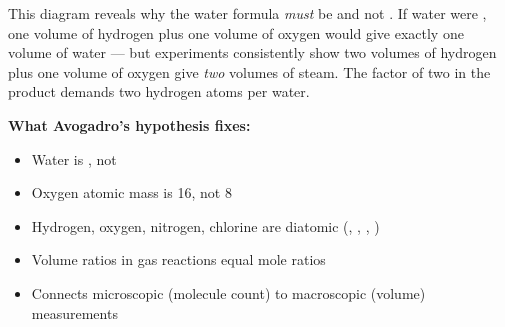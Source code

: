 \documentclass[12pt, a4paper]{book}
\theoremstyle{definition}
\begin{document}
\begin{center}
\end{center}

\vspace{0.5em}

This diagram reveals why the water formula \emph{must} be 
and not .
If water were , one volume of hydrogen plus one volume
of oxygen would give exactly one volume of water --- but
experiments consistently show two volumes of hydrogen
plus one volume of oxygen give \emph{two} volumes of steam.
The factor of two in the product demands two hydrogen atoms per water.

\begin{discoverybox}
\textbf{What Avogadro's hypothesis fixes:}
\begin{itemize}[nosep, leftmargin=2em]
  \item[\checkmark] Water is , not 
  \item[\checkmark] Oxygen atomic mass is 16, not 8
  \item[\checkmark] Hydrogen, oxygen, nitrogen, chlorine are diatomic
        (, , , )
  \item[\checkmark] Volume ratios in gas reactions equal mole ratios
  \item[\checkmark] Connects microscopic (molecule count) to
        macroscopic (volume) measurements
\end{itemize}
\end{discoverybox}
\end{document}
